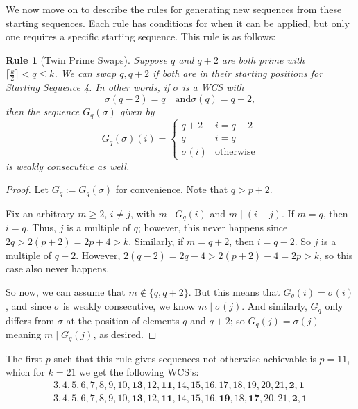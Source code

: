 \documentclass{article}
\newcommand{\ceil}[1]{\lceil #1 \rceil}
\newtheorem{rul}{Rule}
\theoremstyle{definition}
\theoremstyle{remark}
\numberwithin{equation}{section}
\numberwithin{case}{theorem}
\begin{document}
We now move on to describe the rules for generating new sequences from these starting sequences. Each rule has conditions for when it can be applied, but only one requires a specific starting sequence. This rule is as follows: 
\begin{rul}[Twin Prime Swaps]\label{rul:germain}
   Suppose $q$ and $q+2$ are both prime with $\ceil{\frac{k}{2}} < q \leq k$.
   We can swap $q,q+2$ if both are in their starting positions for Starting Sequence 4. In other words, if $\sigma$ is a WCS with
   \[
     \sigma(q - 2) = q \quad \text{and} \sigma(q) = q+2,
   \]
   then the sequence $G_q(\sigma)$ given by 
    $$G_q(\sigma)(i) = \begin{cases} 
          q+2 & i = q-2 \\
          q & i = q \\
          \sigma(i) & \text{otherwise}
       \end{cases}$$
    is weakly consecutive as well.
\end{rul}

\begin{proof}
    Let $G_q := G_q(\sigma)$ for convenience. Note that $q > p + 2$.

    Fix an arbitrary $m \geq 2$, $i \neq j$, with $m \mid G_q(i)$ and $m \mid (i - j)$. If $m = q$, then $i = q$. Thus, $j$ is a multiple of $q$; however, this never happens since $2q > 2(p+2) = 2p + 4 > k$. Similarly, if $m = q + 2$, then $i = q - 2$. So $j$ is a multiple of $q - 2$. However, $2(q - 2) = 2q - 4 > 2(p+2) - 4 = 2p > k$, so this case also never happens.

    So now, we can assume that $m \notin \{ q, q + 2 \}$. But this means that $G_q(i) = \sigma(i)$, and since $\sigma$ is weakly consecutive, we know $m \mid \sigma(j)$. And similarly, $G_q$ only differs from $\sigma$ at the position of elements $q$ and $q + 2$; so $G_q(j) = \sigma(j)$ meaning $m \mid G_q(j)$, as desired.
\end{proof}

The first $p$ such that this rule gives sequences not otherwise achievable is $p = 11$, which for $k = 21$ we get the following WCS's:
\begin{gather*}
    3,4,5,6,7,8,9,10,\mathbf{13},12,\mathbf{11},14,15,16,17,18,19,20,21,\mathbf{2},\mathbf{1} \\
    3,4,5,6,7,8,9,10,\mathbf{13},12,\mathbf{11},14,15,16,\mathbf{19},18,\mathbf{17},20,21,\mathbf{2},\mathbf{1}
\end{gather*}
\end{document}
